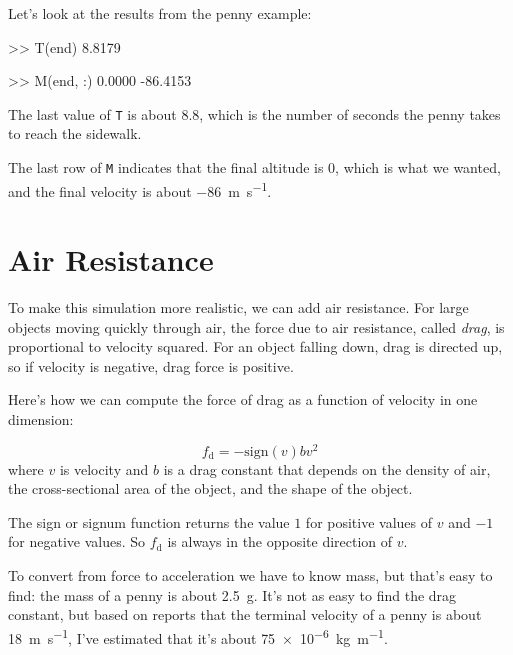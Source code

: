 Let's look at the results from the penny example:  

\begin{code}
>> T(end)
8.8179

>> M(end, :)
0.0000  -86.4153
\end{code}

The last value of \lstinline{T} is about 8.8, which is the number of seconds the penny takes to reach the sidewalk.

The last row of \lstinline{M} indicates that the final altitude is 0, which is what we wanted, and the final velocity is about \SI{-86}{\meter \per \second}.


\section{Air Resistance}
\label{air_resistance}


To make this simulation more realistic, we can add air resistance.
For large objects moving quickly through air, the force due to air resistance, called \emph{drag}, is proportional to velocity squared.  
For an object falling down, drag is
directed up, so if velocity is negative, drag force is positive.


Here's how we can compute the force of drag as a function of velocity in one dimension:

\begin{equation*}
    f_\mathrm{d} = -\mathrm{sign}(v) b v^2 
\end{equation*}
where $v$ is velocity and
$b$ is a drag constant that depends on the density of
air, the cross-sectional area of the object, and the shape
of the object.  

The sign or signum function returns the value $1$ for positive values of 
$v$ and $-1$ for negative values.  So $f_\mathrm{d}$ is always in the opposite direction of $v$.


To convert from force to acceleration we have to know mass, but that's easy to find: the mass of a penny is about \SI{2.5}{\gram}.  It's not as easy to find the drag constant, but based on reports that the terminal velocity of a penny is about \SI{18}{\meter \per \second}, I've estimated that it's about \SI{75e-6}{\kilogram \per \meter}.

